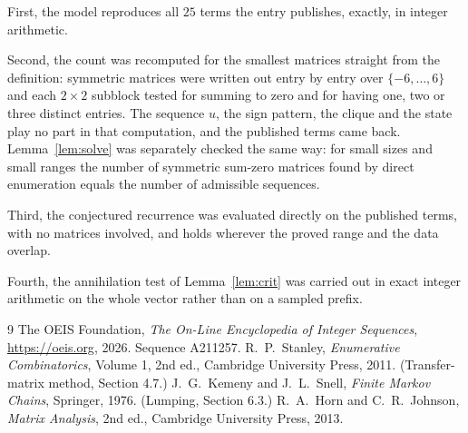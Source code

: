\documentclass[11pt,a4paper]{article}
\theoremstyle{plain}
\theoremstyle{definition}
\begin{document}
First, the model reproduces all $25$ terms the entry publishes, exactly, in integer
arithmetic.

Second, the count was recomputed for the smallest matrices straight from the definition:
symmetric matrices were written out entry by entry over $\{-6,\dots,6\}$ and each
$2\times2$ subblock tested for summing to zero and for having one, two or three distinct entries. The
sequence $u$, the sign pattern, the clique and the state play no part in that computation, and
the published terms came back. Lemma~\ref{lem:solve} was separately checked the same way: for
small sizes and small ranges the number of symmetric sum-zero matrices found by direct
enumeration equals the number of admissible sequences.

Third, the conjectured recurrence was evaluated directly on the published terms, with no
matrices involved, and holds wherever the proved range and the data overlap.

Fourth, the annihilation test of Lemma~\ref{lem:crit} was carried out in exact integer
arithmetic on the whole vector rather than on a sampled prefix.

\begin{thebibliography}{9}
 The OEIS Foundation, \emph{The On-Line Encyclopedia of Integer
Sequences}, \url{https://oeis.org}, 2026. Sequence A211257.
 R.~P.~Stanley, \emph{Enumerative Combinatorics}, Volume 1, 2nd ed.,
Cambridge University Press, 2011. (Transfer-matrix method, Section 4.7.)
 J.~G.~Kemeny and J.~L.~Snell, \emph{Finite Markov Chains}, Springer, 1976.
(Lumping, Section 6.3.)
 R.~A.~Horn and C.~R.~Johnson, \emph{Matrix Analysis}, 2nd ed., Cambridge
University Press, 2013.
\end{thebibliography}
\end{document}
